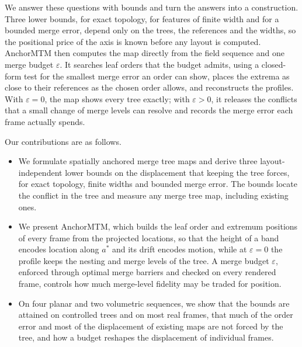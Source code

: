 We answer these questions with bounds and turn the answers into a construction. Three lower bounds, for exact topology, for features of finite width and for a bounded merge error, depend only on the trees, the references and the widths, so the positional price of the axis is known before any layout is computed. AnchorMTM then computes the map directly from the field sequence and one merge budget $\varepsilon$. It searches leaf orders that the budget admits, using a closed-form test for the smallest merge error an order can show, places the extrema as close to their references as the chosen order allows, and reconstructs the profiles. With $\varepsilon=0$, the map shows every tree exactly; with $\varepsilon>0$, it releases the conflicts that a small change of merge levels can resolve and records the merge error each frame actually spends.

Our contributions are as follows.
\begin{itemize}\setlength{\itemsep}{1pt}\setlength{\parsep}{0pt}
\item We formulate spatially anchored merge tree maps and derive three layout-independent lower bounds on the displacement that keeping the tree forces, for exact topology, finite widths and bounded merge error. The bounds locate the conflict in the tree and measure any merge tree map, including existing ones.
\item We present AnchorMTM, which builds the leaf order and extremum positions of every frame from the projected locations, so that the height of a band encodes location along $a^*$ and its drift encodes motion, while at $\varepsilon=0$ the profile keeps the nesting and merge levels of the tree. A merge budget $\varepsilon$, enforced through optimal merge barriers and checked on every rendered frame, controls how much merge-level fidelity may be traded for position.
\item On four planar and two volumetric sequences, we show that the bounds are attained on controlled trees and on most real frames, that much of the order error and most of the displacement of existing maps are not forced by the tree, and how a budget reshapes the displacement of individual frames.
\end{itemize}
